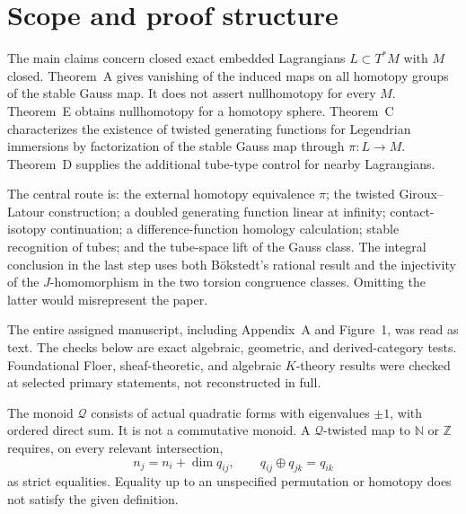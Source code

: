 \documentclass[10pt]{article}
\begin{document}
\section*{Scope and proof structure}
The main claims concern closed exact embedded Lagrangians \(L\subset T^*M\) with \(M\) closed. Theorem A gives vanishing of the induced maps on all homotopy groups of the stable Gauss map. It does not assert nullhomotopy for every \(M\). Theorem E obtains nullhomotopy for a homotopy sphere. Theorem C characterizes the existence of twisted generating functions for Legendrian immersions by factorization of the stable Gauss map through \(\pi:L\to M\). Theorem D supplies the additional tube-type control for nearby Lagrangians.\par
The central route is: the external homotopy equivalence \(\pi\); the twisted Giroux–Latour construction; a doubled generating function linear at infinity; contact-isotopy continuation; a difference-function homology calculation; stable recognition of tubes; and the tube-space lift of the Gauss class. The integral conclusion in the last step uses both Bökstedt’s rational result and the injectivity of the \(J\)-homomorphism in the two torsion congruence classes. Omitting the latter would misrepresent the paper.\par
The entire assigned manuscript, including Appendix A and Figure 1, was read as text. The checks below are exact algebraic, geometric, and derived-category tests. Foundational Floer, sheaf-theoretic, and algebraic \(K\)-theory results were checked at selected primary statements, not reconstructed in full.\par
The monoid \(\mathcal Q\) consists of actual quadratic forms with eigenvalues \(\pm1\), with ordered direct sum. It is not a commutative monoid. A \(\mathcal Q\)-twisted map to \(\mathbb N\) or \(\mathbb Z\) requires, on every relevant intersection, \[n_j=n_i+\dim q_{ij},\qquad q_{ij}\oplus q_{jk}=q_{ik}\] as strict equalities. Equality up to an unspecified permutation or homotopy does not satisfy the given definition.\par
\end{document}
